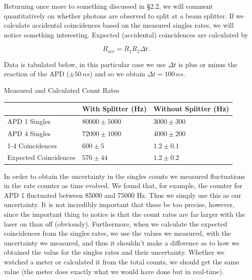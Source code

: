 \documentclass{article}
\begin{document}
\hspace{.25cm}

Returning once more to something discussed in \S 2.2, we will comment quantitatively on whether photons are observed to split at a beam splitter.  If we calculate accidental coincidences based on the measured singles rates, we will notice something interesting.  Expected (accidental) coincidences are calculated by

\begin{equation}
	R_{acc} = R_1R_2\Delta t.
\end{equation}

Data is tabulated below, in this particular case we use $\Delta t$ is plus or minus the reaction of the APD ($\pm 50 \, ns$) and so we obtain $\Delta t = 100 \, ns$.

\begin{center}
Measured and Calculated Count Rates\\
\begin{tabular}{|l|l|l|}
	\hline
	 & With Splitter (Hz) & Without Splitter (Hz) \\ 
	\hline
	APD 1 Singles & $80000 \pm 5000$ & $3000 \pm 300$ \\
	APD 4 Singles & $72000 \pm 1000$ & $4000 \pm 200$ \\
	1-4 Coincidences & $600 \pm 5$ & $1.2 \pm 0.1$ \\
	Expected Coincidences & $576 \pm 44$ & $1.2 \pm 0.2$ \\
	\hline
\end{tabular}
\end{center}

In order to obtain the uncertainty in the singles counts we measured fluctuations in the rate counter as time evolved.  We found that, for example, the counter for APD 1 fluctuated between 85000 and 75000 Hz.  Thus we simply use this as our uncertainty.  It is not incredibly important that these be too precise, however, since the important thing to notice is that the count rates are far larger with the laser on than off (obviously).  Furthermore, when we calculate the expected coincidences from the singles rates, we use the values we measured, with the uncertainty we measured, and thus it shouldn't make a difference as to how we obtained the value for the singles rates and their uncertainty.  Whether we watched a meter or calculated it from the total counts, we should get the same value (the meter does exactly what we would have done but in real-time).

\hspace{.25cm}
\end{document}
